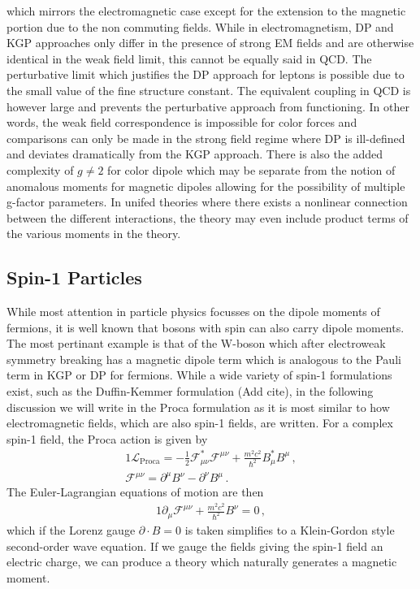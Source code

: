 which mirrors the electromagnetic case except for the extension to the magnetic portion due to the non commuting fields. While in electromagnetism, DP and KGP approaches only differ in the presence of strong EM fields and are otherwise identical in the weak field limit, this cannot be equally said in QCD. The perturbative limit which justifies the DP approach for leptons is possible due to the small value of the fine structure constant. The equivalent coupling in QCD is however large and prevents the perturbative approach from functioning. In other words, the weak field correspondence is impossible for color forces and comparisons can only be made in the strong field regime where DP is ill-defined and deviates dramatically from the KGP approach. There is also the added complexity of $g\neq2$ for color dipole which may be separate from the notion of anomalous moments for magnetic dipoles allowing for the possibility of multiple g-factor parameters. In unifed theories where there exists a nonlinear connection between the different interactions, the theory may even include product terms of the various moments in the theory.

\subsection{Spin-1 Particles}\label{ajss:proca}
While most attention in particle physics focusses on the dipole moments of fermions, it is well known that bosons with spin can also carry dipole moments. The most pertinant example is that of the W-boson which after electroweak symmetry breaking has a magnetic dipole term which is analogous to the Pauli term in KGP or DP for fermions. While a wide variety of spin-1 formulations exist, such as the Duffin-Kemmer formulation {\color{red}(Add cite)}, in the following discussion we will write in the Proca formulation as it is most similar to how electromagnetic fields, which are also spin-1 fields, are written. For a complex spin-1 field, the Proca action is given by
\begin{alignat}{1}
	\label{eq:proca:01a} \mathcal{L}_{\mathrm{Proca}} = -\frac{1}{2}\mathcal{F}_{\mu\nu}^{*}\mathcal{F}^{\mu\nu}+\frac{m^{2}c^{2}}{\hbar^{2}}B_{\mu}^{*}B^{\mu}\,,\\
	\label{eq:proca:01b} \mathcal{F}^{\mu\nu}=\partial^{\mu}B^{\nu}-\partial^{\nu}B^{\mu}\,.
\end{alignat}
The Euler-Lagrangian equations of motion are then
\begin{alignat}{1}
	\label{eq:proca:02a} \partial_{\mu}\mathcal{F}^{\mu\nu}+\frac{m^{2}c^{2}}{\hbar^{2}}B^{\nu}=0\,,
\end{alignat}
which if the Lorenz gauge $\partial\cdot B=0$ is taken simplifies to a Klein-Gordon style second-order wave equation. If we gauge the fields giving the spin-1 field an electric charge, we can produce a theory which naturally generates a magnetic moment.